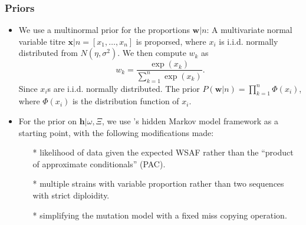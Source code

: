 \documentclass{bioinfo}
\begin{document}
\subsubsection{Priors}\label{sec:prior}
\begin{itemize}
\item We use a multinormal prior for the proportions $\mathbf{w}|n$: A multivariate normal variable titre ${\mathbf x}|n = [x_1,\dots,x_n]$ is proporsed, where $x_i$ is i.i.d. normally distributed from $N(\eta, \sigma^2)$. We then compute $w_k$ as
$$w_k = \frac{\exp(x_k)}{\sum_{k=1}^n \exp(x_k)}.$$ Since $x_i$s are i.i.d. normally distributed. The prior $P(\mathbf{w}|n) = \displaystyle\prod_{k=1}^n \Phi(x_i)$, where $\Phi(x_i)$ is the distribution function of $x_i$.


\item For the prior on $\mathbf{h} | \omega, \Xi$, we use \citet{Li2003}'s hidden Markov model framework as a starting point, with the following modifications made:
\begin{itemize}
\item[*] likelihood of data given the expected WSAF rather than the ``product of approximate conditionals'' (PAC).
\item[*] multiple strains with variable proportion rather than two sequences with strict diploidity.
\item[*] simplifying the mutation model with a fixed miss copying operation.
\end{itemize}


\end{itemize}
\end{document}
